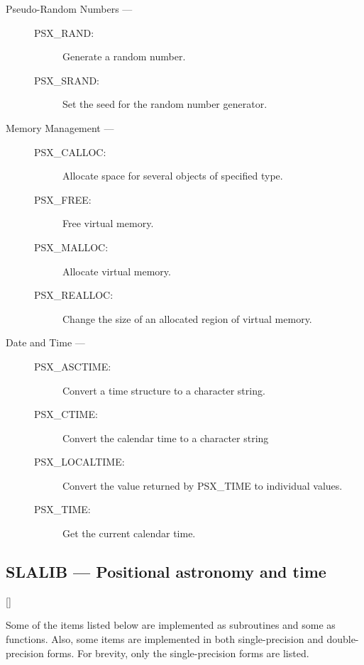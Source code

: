 \begin{description}

\item [Pseudo-Random Numbers ---]

\begin{description}
\item [PSX\_RAND:]  Generate a random number.
\item [PSX\_SRAND:]  Set the seed for the random number generator.
\end{description}

\item [Memory Management ---]

\begin{description}
\item [PSX\_CALLOC:]  Allocate space for several objects of specified type.
\item [PSX\_FREE:]  Free virtual memory.
\item [PSX\_MALLOC:]  Allocate virtual memory.
\item [PSX\_REALLOC:]  Change the size of an allocated region of virtual memory.
\end{description}

\item [Date and Time ---]

\begin{description}
\item [PSX\_ASCTIME:]  Convert a time structure to a character string.
\item [PSX\_CTIME:]  Convert the calendar time to a character string
\item [PSX\_LOCALTIME:]  Convert the value returned by PSX\_TIME to individual values.
\item [PSX\_TIME:]  Get the current calendar time.
\end{description}
\end{description}

\newpage

\subsection{SLALIB --- Positional astronomy and time}

\vspace{-9mm}

\hfill []

\vspace{2mm}

Some of the items listed below are implemented as subroutines and some as
functions.
Also, some items are implemented in both single-precision and double-precision
forms.
For brevity, only the single-precision forms are listed.

